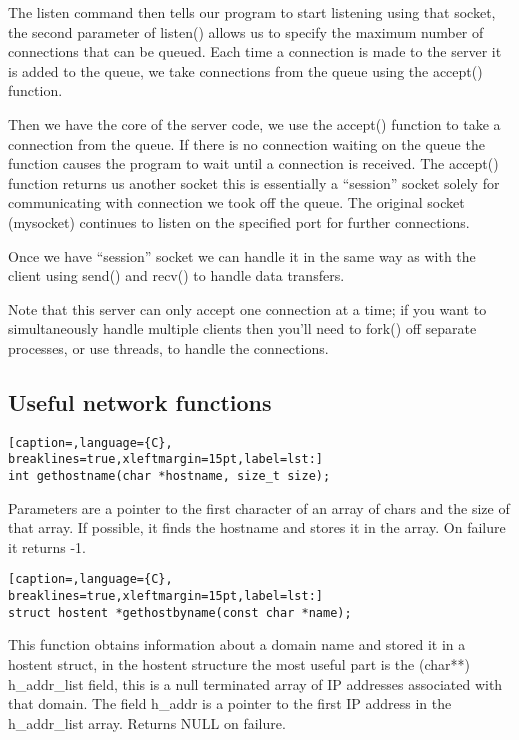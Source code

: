 The listen command then tells our program to start listening using that socket,
the second parameter of listen() allows us to specify the maximum number of
connections that can be queued. Each time a connection is made to the server it
is added to the queue, we take connections from the queue using the accept()
function.

Then we have the core of the server code, we use the accept() function to take
a connection from the queue. If there is no connection waiting on the queue the
function causes the program to wait until a connection is received. The
accept() function returns us another socket this is essentially a ``session''
socket solely for communicating with connection we took off the queue. The
original socket (mysocket) continues to listen on the specified port for
further connections.

Once we have ``session'' socket we can handle it in the same way as with the
client using send() and recv() to handle data transfers.

Note that this server can only accept one connection at a time; if you want to
simultaneously handle multiple clients then you'll need to fork() off separate
processes, or use threads, to handle the connections.

\subsection{Useful network functions}
\lstset{basicstyle=\scriptsize, numbers=left, captionpos=b, tabsize=4}
\begin{lstlisting}[caption=,language={C},
breaklines=true,xleftmargin=15pt,label=lst:]
int gethostname(char *hostname, size_t size);
\end{lstlisting}

Parameters are a pointer to the first character of an array of chars and the
size of that array. If possible, it finds the hostname and stores it in the
array. On failure it returns -1.
\lstset{basicstyle=\scriptsize, numbers=left, captionpos=b, tabsize=4}
\begin{lstlisting}[caption=,language={C},
breaklines=true,xleftmargin=15pt,label=lst:]
struct hostent *gethostbyname(const char *name);
\end{lstlisting}

This function obtains information about a domain name and stored it in a
hostent struct, in the hostent structure the most useful part is the (char**)
h\_addr\_list field, this is a null terminated array of IP addresses associated
with that domain. The field h\_addr is a pointer to the first IP address in the
h\_addr\_list array. Returns NULL on failure.

